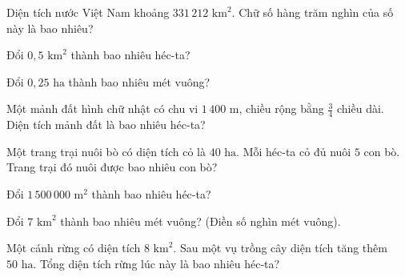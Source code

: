 \begin{ex}
  Diện tích nước Việt Nam khoảng $331\,212\text{ km}^2$. Chữ số hàng trăm nghìn của số này là bao nhiêu?
\end{ex}

\begin{ex}
  Đổi $0{,}5\text{ km}^2$ thành bao nhiêu héc-ta?
\end{ex}

\begin{ex}
  Đổi $0{,}25\text{ ha}$ thành bao nhiêu mét vuông?
\end{ex}

\begin{ex}
  Một mảnh đất hình chữ nhật có chu vi $1\,400\text{ m}$, chiều rộng bằng $\frac{3}{4}$ chiều dài. Diện tích mảnh đất là bao nhiêu héc-ta?
\end{ex}

\begin{ex}
  Một trang trại nuôi bò có diện tích cỏ là $40\text{ ha}$. Mỗi héc-ta cỏ đủ nuôi $5$ con bò. Trang trại đó nuôi được bao nhiêu con bò?
\end{ex}

\begin{ex}
  Đổi $1\,500\,000\text{ m}^2$ thành bao nhiêu héc-ta?
\end{ex}

\begin{ex}
  Đổi $7\text{ km}^2$ thành bao nhiêu mét vuông? (Điền số nghìn mét vuông).
\end{ex}

\begin{ex}
  Một cánh rừng có diện tích $8\text{ km}^2$. Sau một vụ trồng cây diện tích tăng thêm $50\text{ ha}$. Tổng diện tích rừng lúc này là bao nhiêu héc-ta?
\end{ex}

